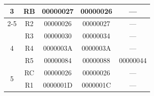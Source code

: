 \begin{table}[ht]
{\begin{tabular}{|c|c|cc|c|}
        \multirow{2}{*}{3}          & RB                              & \multicolumn{1}{c|}{00000027}                                                        & 00000026                                                           & ---                                                                                        \\ \cline{2-5} 
                                    & R2                              & \multicolumn{1}{c|}{00000026}                                                        & 00000027                                                           & ---                                                                                        \\ \hline
        \multirow{3}{*}{4}          & R3                              & \multicolumn{1}{c|}{00000030}                                                        & 00000034                                                           & ---                                                                                        \\ \cline{2-5} 
                                    & R4                              & \multicolumn{1}{c|}{0000003A}                                                        & 0000003A                                                           & ---                                                                                        \\ \cline{2-5} 
                                    & R5                              & \multicolumn{1}{c|}{00000084}                                                        & 00000088                                                           & 00000044                                                                                   \\ \hline
        \multirow{2}{*}{5}          & RC                              & \multicolumn{1}{c|}{00000026}                                                        & 00000026                                                           & ---                                                                                        \\ \cline{2-5} 
                                    & R1                              & \multicolumn{1}{c|}{0000001D}                                                        & 0000001C                                                           & ---                                                                                        \\ \hline
    \end{tabular}%
    }
\end{table}